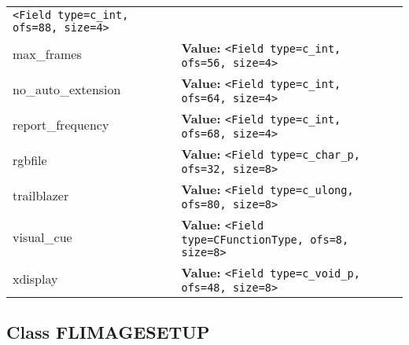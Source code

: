 \begin{longtable}{|p{\varnamewidth}|p{\vardescrwidth}|l}
{\tt {\textless}Field type=c\_int, ofs=88, size=4{\textgreater}}&\\
\cline{1-2}
\raggedright m\-a\-x\-\_\-f\-r\-a\-m\-e\-s\- & \raggedright \textbf{Value:} 
{\tt {\textless}Field type=c\_int, ofs=56, size=4{\textgreater}}&\\
\cline{1-2}
\raggedright n\-o\-\_\-a\-u\-t\-o\-\_\-e\-x\-t\-e\-n\-s\-i\-o\-n\- & \raggedright \textbf{Value:} 
{\tt {\textless}Field type=c\_int, ofs=64, size=4{\textgreater}}&\\
\cline{1-2}
\raggedright r\-e\-p\-o\-r\-t\-\_\-f\-r\-e\-q\-u\-e\-n\-c\-y\- & \raggedright \textbf{Value:} 
{\tt {\textless}Field type=c\_int, ofs=68, size=4{\textgreater}}&\\
\cline{1-2}
\raggedright r\-g\-b\-f\-i\-l\-e\- & \raggedright \textbf{Value:} 
{\tt {\textless}Field type=c\_char\_p, ofs=32, size=8{\textgreater}}&\\
\cline{1-2}
\raggedright t\-r\-a\-i\-l\-b\-l\-a\-z\-e\-r\- & \raggedright \textbf{Value:} 
{\tt {\textless}Field type=c\_ulong, ofs=80, size=8{\textgreater}}&\\
\cline{1-2}
\raggedright v\-i\-s\-u\-a\-l\-\_\-c\-u\-e\- & \raggedright \textbf{Value:} 
{\tt {\textless}Field type=CFunctionType, ofs=8, size=8{\textgreater}}&\\
\cline{1-2}
\raggedright x\-d\-i\-s\-p\-l\-a\-y\- & \raggedright \textbf{Value:} 
{\tt {\textless}Field type=c\_void\_p, ofs=48, size=8{\textgreater}}&\\
\cline{1-2}
\end{longtable}



\subsection{Class FLIMAGESETUP}

